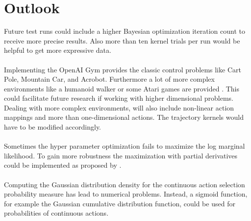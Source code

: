\chapter{Outlook}
\label{chap:7}

Future test runs could include a higher Bayesian optimization iteration count to receive more precise results. Also more than ten kernel trials per run would be helpful to get more expressive data.\\
\\
Implementing the OpenAI Gym provides the classic control problems like Cart Pole, Mountain Car, and Acrobot. Furthermore a lot of more complex environments like a humanoid walker or some Atari games are provided \cite{DBLP:journals/corr/BrockmanCPSSTZ16}. This could facilitate future research if working with higher dimensional problems.\\
Dealing with more complex environments, will also include non-linear action mappings and more than one-dimensional actions. The trajectory kernels would have to be modified accordingly.\\
\\
Sometimes the hyper parameter optimization fails to maximize the log marginal likelihood. To gain more robustness the maximization with partial derivatives could be implemented as proposed by \cite{rasmussen2006gaussian, lizotte2008practical}.\\
\\
Computing the Gaussian distribution density for the continuous action selection probability measure has lead to numerical problems. Instead, a sigmoid function, for example the Gaussian cumulative distribution function, could be used for probabilities of continuous actions.\\
\\
